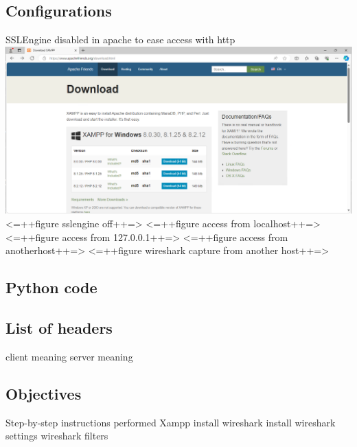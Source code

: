 \documentclass[11pt]{report}
\begin{document}
{{{    \subsection{Configurations}
        SSLEngine disabled in apache to ease access with http
        \includegraphics[scale=1.0]{xampp01} \\
        <=++figure sslengine off++=>
        <=++figure access from localhost++=>
        <=++figure access from 127.0.0.1++=>
        <=++figure access from anotherhost++=>
        <=++figure wireshark capture from another host++=>
    
    \subsection{Python code}
        \lstset{style=pythoncode}
        
    
    \subsection{List of headers}
        client
            meaning
        server
            meaning
    
    \subsection{Objectives}
        Step-by-step instructions performed
        Xampp install
        wireshark install
        wireshark settings
        wireshark filters
        
}}}
\end{document}
